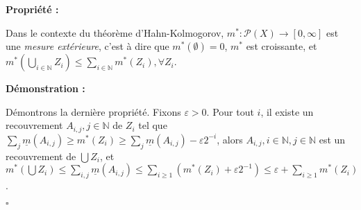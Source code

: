 \documentclass[10pt,a4paper,notitlepage ]{report}
\newcounter{th}
\newenvironment{propriete}[1][]{
	\begin{tcolorbox}
		\textbf{Propriété #1 : }
}
{\end{tcolorbox}}
\newenvironment{demo}[1][]{

	\textbf{Démonstration #1 :}
}{\begin{flushright}
	$\square$
\end{flushright}
}
\begin{document}
\begin{propriete}
	Dans le contexte du théorème d'Hahn-Kolmogorov, $m^* : \mathcal P(X) \rightarrow [0,\infty]$ est une \emph{mesure extérieure}, c'est à dire que $m^*(\emptyset) = 0$, $m^*$ est croissante, et $m^*\left(\underset{i\in \mathbb N} \bigcup Z_i\right) \le \underset{i\in\mathbb N}\sum m^*(Z_i), \forall Z_i$.
\end{propriete}

\begin{demo}
	Démontrons la dernière propriété. Fixons $\varepsilon > 0$. Pour tout $i$, il existe un recouvrement $A_{i,j}, j\in \mathbb N$ de $Z_i$ tel que $\underset j \sum \underline m(A_{i,j}) \ge m^*(Z_i) \ge \underset j \sum \underline m (A_{i,j}) - \varepsilon 2^{-i}$, alors $A_{i,j}, i\in \mathbb N, j \in \mathbb N$ est un recouvrement de $\bigcup Z_i$, et $m^*(\bigcup Z_i) \le \underset {i,j} \sum \underline m (A_{i,j}) \le \underset {i \ge 1} \sum (m^*(Z_i) + \varepsilon 2^{-1}) \le \varepsilon + \underset {i \ge 1} \sum m^*(Z_i)$.
\end{demo}
\end{document}
